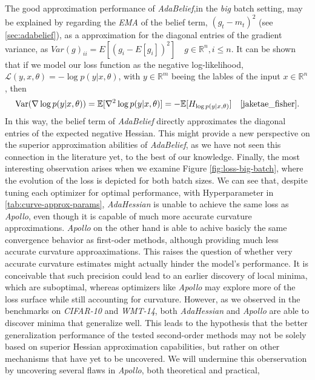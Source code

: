 The good approximation performance of \emph{AdaBelief},in the \emph{big} batch setting,  may be explained by regarding the \emph{EMA} of the belief term, $(g_t - m_t)^2$ (see \ref{sec:adabelief}), 
as a approximation for the diagonal entries of the gradient variance, as $Var(g)_{ii} = E[(g_i - E[g_i])^2] \quad g \in \mathbb{R}^n, i \leq n$.
It can be shown that if we model our loss function as the negative log-likelihood, $\mathcal{L}(y,x,\theta) = - \log p(y|x,\theta)$, with $y \in \mathbb{R}^m$ beeing the lables of the input $x\in \mathbb{R}^n$, then
\begin{equation}
    \text{Var}(\nabla \log p(y|x,\theta)) = \mathbb{E}[\nabla^2 \log p(y|x,\theta)] = - \mathbb{E}[H_{\log p(y|x,\theta)}] \quad \text{\cite{jaketae_fisher}}.
\end{equation}
In this way, the belief term of \emph{AdaBelief} directly approximates the diagonal entries of the expected negative Hessian.
This might provide a new perspective on the superior approximation abilities of \emph{AdaBelief},
as we have not seen this connection in the literature yet, to the best of our knowledge.
Finally, the most interesting observation arises when we examine Figure \ref{fig:loss-big-batch},
where the evolution of the loss is depicted for both batch sizes.
We can see that, despite tuning each optimizer for optimal performance, with Hyperparameter in \ref{tab:curve-approx-params}, \emph{AdaHessian} is unable to achieve the same loss as \emph{Apollo},
even though it is capable of much more accurate curvature approximations. \emph{Apollo} on the other hand is 
able to achive basicly the same convergence behavior as first-oder methods, although providing much less accurate curvature
approaximations.
This raises the question of whether very accurate curvature estimates might actually hinder
the model's performance. It is conceivable that such precision could lead to an
earlier discovery of local minima, which are suboptimal, whereas optimizers like
\emph{Apollo} may explore more of the loss surface while still accounting for curvature.
However, as we observed in the benchmarks on \emph{CIFAR-10} and \emph{WMT-14}, both \emph{AdaHessian} and \emph{Apollo} are able to discover minima that generalize well.
This leads to the hypothesis that the better generalization performance of the tested second-order
methods may not be solely based on superior Hessian approximation capabilities,
but rather on other mechanisms that have yet to be uncovered.
We will undermine this oberservation by uncovering several flaws in \emph{Apollo}, both theoretical and practical,
